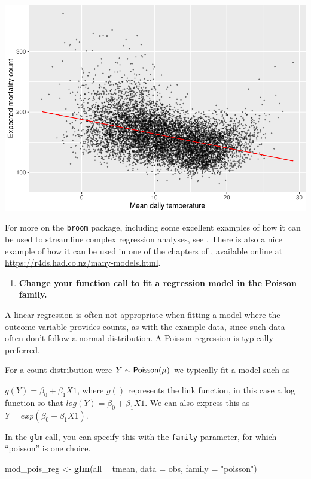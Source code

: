 \documentclass[
]{book}
\newenvironment{Shaded}{\begin{snugshade}}{\end{snugshade}}
\newcommand{\DataTypeTok}[1]{\textcolor[rgb]{0.13,0.29,0.53}{#1}}
\newcommand{\KeywordTok}[1]{\textcolor[rgb]{0.13,0.29,0.53}{\textbf{#1}}}
\newcommand{\NormalTok}[1]{#1}
\newcommand{\OperatorTok}[1]{\textcolor[rgb]{0.81,0.36,0.00}{\textbf{#1}}}
\newcommand{\StringTok}[1]{\textcolor[rgb]{0.31,0.60,0.02}{#1}}
\providecommand{\tightlist}{%
  \setlength{\itemsep}{0pt}\setlength{\parskip}{0pt}}
\begin{document}
\includegraphics{adv_epi_analysis_files/figure-latex/unnamed-chunk-29-1.pdf}

For more on the \texttt{broom} package, including some excellent examples of how it
can be used to streamline complex regression analyses, see \citet{robinson2014broom}.
There is also a nice example of how it can be used in one of the chapters of
\citet{wickham2016r}, available online at \url{https://r4ds.had.co.nz/many-models.html}.

\begin{enumerate}
\def\labelenumi{\arabic{enumi}.}
\setcounter{enumi}{1}
\tightlist
\item
  \textbf{Change your function call to fit a regression model in the Poisson family.}
\end{enumerate}

A linear regression is often not appropriate when fitting a model where the
outcome variable provides counts, as with the example data, since such data
often don't follow a normal distribution. A Poisson regression
is typically preferred.

For a count distribution were \(Y \sim {\sf Poisson(\mu)}\) we typically fit a model
such as

\(g(Y)=\beta_{0}+\beta_{1}X1\), where \(g()\) represents the link function, in this
case a log function so that \(log(Y)=\beta_{0}+\beta_{1}X1\). We can also express
this as \(Y=exp(\beta_{0}+\beta_{1}X1)\).

In the \texttt{glm} call, you can specify this with the \texttt{family}
parameter, for which ``poisson'' is one choice.

\begin{Shaded}
\begin{Highlighting}[]
\NormalTok{mod_pois_reg <-}\StringTok{ }\KeywordTok{glm}\NormalTok{(all }\OperatorTok{~}\StringTok{ }\NormalTok{tmean, }\DataTypeTok{data =}\NormalTok{ obs, }\DataTypeTok{family =} \StringTok{"poisson"}\NormalTok{)}
\end{Highlighting}
\end{Shaded}
\end{document}
